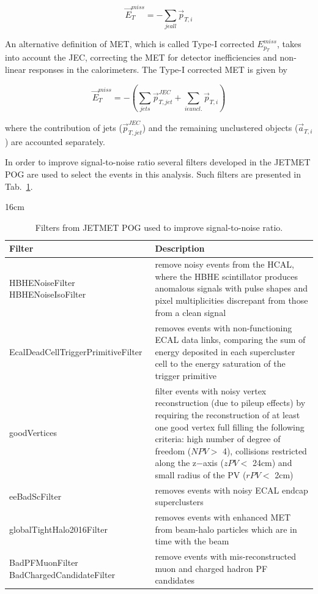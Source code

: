 \begin{equation}
\vec{E}_{T}^{miss} = - \sum_{j\epsilon all} \vec{p}_{T,i}
\end{equation}

An alternative definition of MET, which is called Type-I corrected $E_{p_{T}}^{miss}$, takes into account the JEC, correcting the MET for detector inefficiencies and non-linear responses in the calorimeters. The Type-I corrected MET is given by

\begin{equation}
\vec{E}_{T}^{miss} = - \left( \sum_{jets} \vec{p}_{T,jet}^{JEC} + \sum_{i \epsilon uncl.} \vec{p}_{T,i} \right)
\end{equation}

where the contribution of jets ($\vec{p}_{T,jet}^{JEC}$) and the remaining unclustered objects ($\vec{a}_{T,i}$) are accounted separately.

In order to improve signal-to-noise ratio several filters developed in the JETMET POG \cite{bib:CMS-AN-16-442} are used to select the events in this analysis. Such filters are presented in Tab.~\ref{tab:jetmet_filters}.

\begin{table}[hbtp]{16cm}
	\caption{Filters from JETMET POG used to improve signal-to-noise ratio.}
	\centering
	\begin{tabular}{p{6cm}|p{9cm}}
		\hline
		Filter & Description\\
		\hline
		HBHENoiseFilter \hspace{3cm} HBHENoiseIsoFilter & remove noisy events from the HCAL, where the HBHE scintillator produces anomalous signals with pulse shapes and pixel multiplicities discrepant from those from a clean signal\\
		\hline
		EcalDeadCellTriggerPrimitiveFilter & removes events with non-functioning ECAL data links, comparing the sum of energy deposited in each supercluster cell to the energy saturation of the trigger primitive\\
		\hline
		goodVertices & filter events with noisy vertex reconstruction (due to pileup effects) by requiring the reconstruction of at least one good vertex full filling the following criteria: high number of degree of freedom ($NPV>$ 4), collisions restricted along the z−axis ($zPV<$ 24cm) and small radius of the PV ($rPV<$ 2cm)\\
		\hline
		eeBadScFilter & removes events with noisy ECAL endcap superclusters\\
		\hline
		globalTightHalo2016Filter & removes events with enhanced MET from beam-halo particles which are in time with the beam\\
		\hline
		BadPFMuonFilter \hspace{3cm} BadChargedCandidateFilter & remove events with mis-reconstructed muon and charged hadron PF candidates\\
		\hline
	\end{tabular}
	\label{tab:jetmet_filters}
\end{table}


